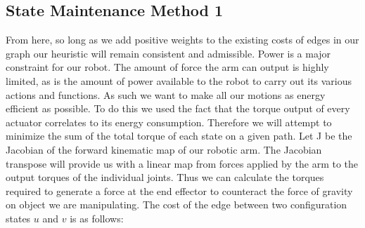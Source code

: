 \documentclass{article}
\begin{document}
\subsection{State Maintenance Method 1}

	From here, so long as we add positive weights to the existing costs of edges in our graph our heuristic will remain consistent and admissible.  Power is a major constraint for our robot. The amount of force the arm can output is highly limited, as is the amount of power available to the robot to carry out its various actions and functions.  As such we want to make all our motions as energy efficient as possible.  To do this we used the fact that the torque output of every actuator correlates to its energy consumption.  Therefore we will attempt to minimize the sum of the total torque of each state on a given path.  Let J be the Jacobian of the forward kinematic map of our robotic arm.  The Jacobian transpose will provide us with a linear map from forces applied by the arm to the output torques of the individual joints.  Thus we can calculate the torques required to generate a force at the end effector to counteract the force of gravity on object we are manipulating.   The cost of the edge between two configuration states $u$ and $v$ is as follows:
	
\end{document}
